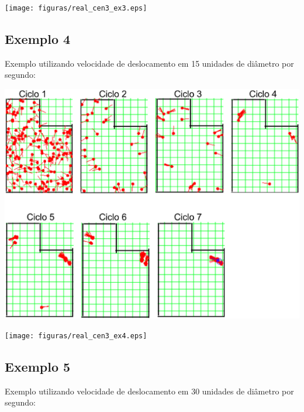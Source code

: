 {\centering
\texttt{[image: figuras/real\_cen3\_ex3.eps]}
\label{img:real_cen3_ex3}
\par}

\subsection{Exemplo 4}

Exemplo utilizando velocidade de deslocamento em 15 unidades de diâmetro por segundo:

{\centering
\includegraphics[scale=0.4]{figuras/cen3_ex4.eps}
\label{img:cen3_ex4}
\par}

{\centering
\texttt{[image: figuras/real\_cen3\_ex4.eps]}
\label{img:real_cen3_ex4}
\par}

\subsection{Exemplo 5}

Exemplo utilizando velocidade de deslocamento em 30 unidades de diâmetro por segundo:

